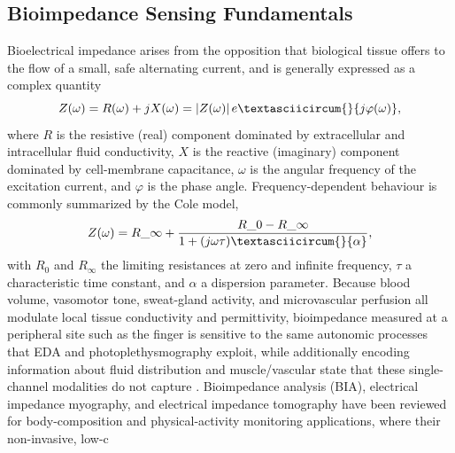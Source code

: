 \subsection{Bioimpedance Sensing Fundamentals}
Bioelectrical impedance arises from the opposition that biological tissue offers to the flow of a small, safe alternating current, and is generally expressed as a complex quantity
\begin{equation}
Z(\omega) = R(\omega) + jX(\omega) = |Z(\omega)|\,e\textasciicircum{}{j\varphi(\omega)},
\end{equation}
where $R$ is the resistive (real) component dominated by extracellular and intracellular fluid conductivity, $X$ is the reactive (imaginary) component dominated by cell-membrane capacitance, $\omega$ is the angular frequency of the excitation current, and $\varphi$ is the phase angle. Frequency-dependent behaviour is commonly summarized by the Cole model,
\begin{equation}
Z(\omega) = R\_\infty + \frac{R\_0 - R\_\infty}{1 + (j\omega\tau)\textasciicircum{}{\alpha}},
\end{equation}
with $R_0$ and $R_\infty$ the limiting resistances at zero and infinite frequency, $\tau$ a characteristic time constant, and $\alpha$ a dispersion parameter. Because blood volume, vasomotor tone, sweat-gland activity, and microvascular perfusion all modulate local tissue conductivity and permittivity, bioimpedance measured at a peripheral site such as the finger is sensitive to the same autonomic processes that EDA and photoplethysmography exploit, while additionally encoding information about fluid distribution and muscle/vascular state that these single-channel modalities do not capture \cite{jacobs2026advancing}. Bioimpedance analysis (BIA), electrical impedance myography, and electrical impedance tomography have been reviewed for body-composition and physical-activity monitoring applications, where their non-invasive, low-c

